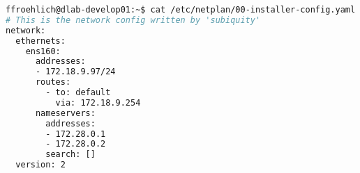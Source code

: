 \begin{lstlisting}[caption=\texttt{netplan}-Konfigurationsdatei, label=netplanlisting, language=bash]
ffroehlich@dlab-develop01:~$ cat /etc/netplan/00-installer-config.yaml
# This is the network config written by 'subiquity'
network:
  ethernets:
    ens160:
      addresses:
      - 172.18.9.97/24
      routes:
        - to: default
          via: 172.18.9.254
      nameservers:
        addresses:
        - 172.28.0.1
        - 172.28.0.2
        search: []
  version: 2
\end{lstlisting}
